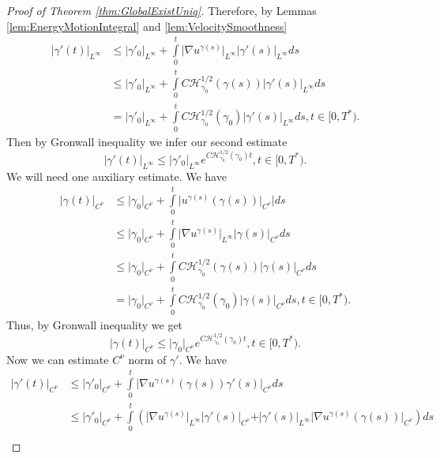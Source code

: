 \documentclass[11pt,a4paper,leqno]{amsart}%
\theoremstyle{plain}
\theoremstyle{remark}
\theoremstyle{plain}
\numberwithin{equation}{section}
\def\intl{\int\limits}
\begin{document}
\begin{proof}[Proof of Theorem \ref{thm:GlobalExistUniq}]
Therefore, by Lemmas \ref{lem:EnergyMotionIntegral} and
\ref{lem:VelocitySmoothness}
\begin{align}
\vert \gamma'(t)\vert_{L^{\infty}}&\leq\vert \gamma'_0\vert_{L^{\infty}}+\intl_0^t\vert \nabla
u^{\gamma(s)}\vert_{L^{\infty}}\vert \gamma'(s)\vert_{L^{\infty}}ds\nonumber\\
&\leq\vert \gamma'_0\vert_{L^{\infty}}+\intl_0^tC\mathcal{H}_{\gamma_0}^{1/2}(\gamma(s))\vert \gamma'(s)\vert_{L^{\infty}}ds\nonumber\\
&=\vert \gamma'_0\vert_{L^{\infty}}+\intl_0^tC\mathcal{H}_{\gamma_0}^{1/2}(\gamma_0)\vert \gamma'(s)\vert_{L^{\infty}}ds,t\in[0,T^*).
\end{align}
Then by Gronwall inequality we infer our second estimate
\begin{equation}
\vert \gamma'(t)\vert_{L^{\infty}}\leq\vert \gamma'_0\vert_{L^{\infty}}e^{C\mathcal{H}_{\gamma_0}^{1/2}(\gamma_0)t},t\in[0,T^*).\label{eqn:GEUEstim-2}
\end{equation}
We will need one auxiliary estimate. We have
\begin{align}
\vert \gamma(t)\vert_{C^{\nu}}&\leq\vert \gamma_0\vert_{C^{\nu}}+\intl_0^t\vert
u^{\gamma(s)}(\gamma(s))\vert_{C^{\nu}}\vert ds\nonumber\\
&\leq\vert \gamma_0\vert_{C^{\nu}}+\intl_0^t\vert \nabla
u^{\gamma(s)}\vert_{L^{\infty}}\vert \gamma(s)\vert_{C^{\nu}}ds\nonumber\\
&\leq
\vert \gamma_0\vert_{C^{\nu}}+\intl_0^tC\mathcal{H}_{\gamma_0}^{1/2}(\gamma(s))\vert \gamma(s)\vert_{C^{\nu}}ds\nonumber\\
&=\vert \gamma_0\vert_{C^{\nu}}+\intl_0^tC\mathcal{H}_{\gamma_0}^{1/2}(\gamma_0)\vert \gamma(s)\vert_{C^{\nu}}ds,t\in[0,T^*).
\end{align}
Thus, by Gronwall inequality we get
\begin{equation}
\vert \gamma(t)\vert_{C^{\nu}}\leq\vert \gamma_0\vert_{C^{\nu}}e^{C\mathcal{H}_{\gamma_0}^{1/2}(\gamma_0)t},t\in[0,T^*).\label{eqn:GEUEstim-aux}
\end{equation}
Now we can estimate $C^{\nu}$ norm of $\gamma'$. We have
\begin{align}
\vert \gamma'(t)\vert_{C^{\nu}}&\leq\vert \gamma'_0\vert_{C^{\nu}}+\intl_0^t\vert \nabla
u^{\gamma(s)}(\gamma(s))\gamma'(s)\vert_{C^{\nu}}ds\nonumber\\
&\leq \vert \gamma'_0\vert_{C^{\nu}}+\intl_0^t(\vert \nabla
u^{\gamma(s)}\vert_{L^{\infty}}\vert \gamma'(s)\vert_{C^{\nu}}+\vert \gamma'(s)\vert_{L^{\infty}}\vert \nabla
u^{\gamma(s)}(\gamma(s))\vert_{C^{\nu}})ds\nonumber\\

\end{align}
\end{proof}
\end{document}
